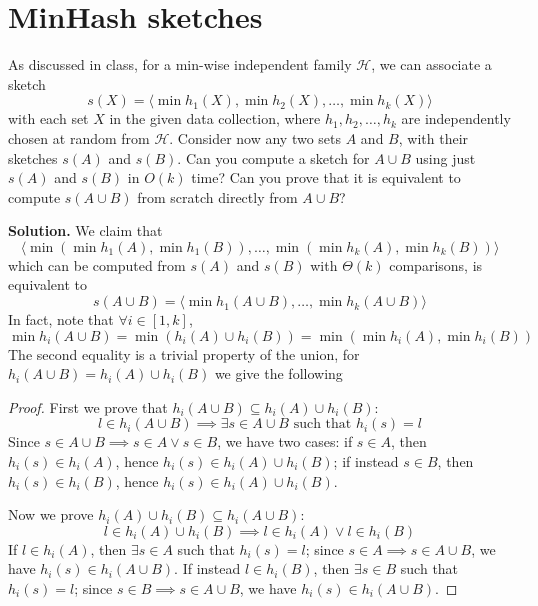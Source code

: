 \section{MinHash sketches}

As discussed in class, for a min-wise independent family $\mathcal{H}$, we can associate a sketch $$s(X) = \langle \min h_1(X), \min h_2(X), \dots , \min h_k(X) \rangle$$ with each set $X$ in the given data collection, where $h_1, h_2, \dots , h_k$ are independently chosen at random from $\mathcal{H}$. Consider now any two sets $A$ and $B$, with their sketches $s(A)$ and $s(B)$. Can you compute a sketch for $A \cup B$ using just $s(A)$ and $s(B)$ in $O(k)$ time? Can you prove that it is equivalent to compute $s(A \cup B)$ from scratch directly from $A \cup B$?

\vspace{1cm}
\noindent
\textbf{Solution.}  We claim that
$$\langle \min(\min h_1(A), \min h_1(B)), \dots, \min(\min h_k(A), \min h_k(B))\rangle$$
which can be computed from $s(A)$ and $s(B)$ with $\Theta(k)$ comparisons, is equivalent to
$$s(A \cup B) = \langle \min h_1(A \cup B), \dots , \min h_k(A \cup B) \rangle$$
In fact, note that $\forall i \in [1, k]$, $$\min h_i(A \cup B) = \min (h_i(A) \cup h_i(B)) = \min ( \min h_i(A), \min h_i(B))$$
The second equality is a trivial property of the union, for $h_i(A \cup B) = h_i(A) \cup h_i(B)$ we give the following
\begin{proof}
  First we prove that $h_i(A \cup B) \subseteq h_i(A) \cup h_i(B)$:
  $$l \in h_i(A \cup B) \implies \exists s \in A \cup B \text{ such that } h_i(s) = l$$
 Since $s \in A \cup B \implies s \in A \vee s \in B$, we have two cases: if $s\in A$, then $h_i(s) \in h_i(A)$, hence $ h_i(s) \in h_i(A)\cup h_i(B)$; if instead $s\in B$, then $h_i(s) \in h_i(B) $, hence $ h_i(s) \in h_i(A)\cup h_i(B)$.

  Now we prove $h_i(A) \cup h_i(B) \subseteq h_i(A \cup B)$:
  $$l \in h_i(A) \cup h_i(B) \implies l \in h_i(A) \vee l \in h_i(B)$$
  If $l \in h_i(A)$, then $\exists s \in A$ such that $h_i(s)=l$; since $s \in A \implies s \in A \cup B$, we have $h_i(s) \in h_i(A \cup B)$. If instead $l \in h_i(B)$, then $\exists s \in B$ such that $h_i(s)=l$; since $s \in B \implies s \in A \cup B$, we have $h_i(s) \in h_i(A \cup B)$.
\end{proof}